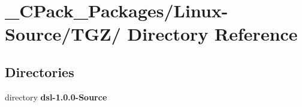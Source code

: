 \section{\_\-CPack\_\-Packages/Linux-\/Source/TGZ/ Directory Reference}
\label{dir_e0d20105775aa1d278077eff645e1337}
\subsection*{Directories}
\begin{DoxyCompactItemize}
\item 
directory {\bf dsl-\/1.0.0-\/Source}
\end{DoxyCompactItemize}
